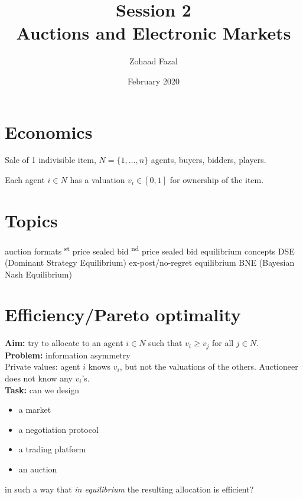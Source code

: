 \documentclass{article}
\title{Session 2 \\
\Large{Auctions and Electronic Markets}
}
\author{Zohaad Fazal}
\date{February 2020}
\begin{document}
{\pgfpointorigin}{\pgfpoint{1cm}{1cm}}
{\pgfpoint{0.3cm}{0.3cm}}
\maketitle

\section*{Economics}
Sale of 1 indivisible item, $N=\{1,\dots,n\}$ agents, buyers, bidders, players.

\noindent
Each agent $i\in N$ has a valuation $v_i\in [0,1]$ for ownership of the item.

\section*{Topics}
\begin{outline}
    \1 auction formats
        \textsuperscript{st} price sealed bid
        \textsuperscript{nd} price sealed bid
    \1 equilibrium concepts
        \2 DSE (Dominant Strategy Equilibrium)
        \2 ex-post/no-regret equilibrium
        \2 BNE (Bayesian Nash Equilibrium)
        
\end{outline}

\section*{Efficiency/Pareto optimality}
\textbf{Aim:} try to allocate to an agent $i\in N$ such that $v_i \geq v_j$ for all $j\in N$. \\

\noindent
\textbf{Problem:} information asymmetry \\
\noindent
Private values: agent $i$ knows $v_i$, but not the valuations of the others. Auctioneer does not know any $v_i$'s.\\

\noindent
\textbf{Task:} can we design 
\begin{itemize}
    \item a market
    \item a negotiation protocol
    \item a trading platform
    \item an auction
\end{itemize}
in such a way that \textit{in equilibrium} the resulting allocation is efficient?\\
\end{document}
